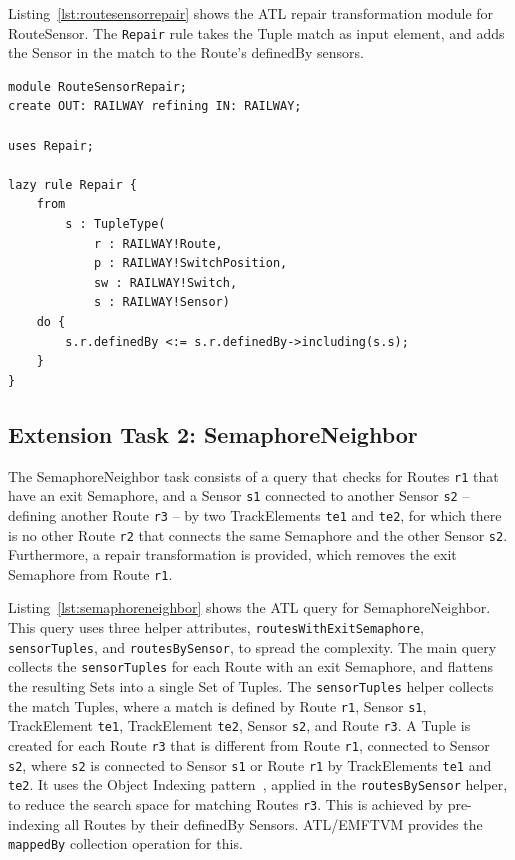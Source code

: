 \documentclass[submission,copyright,creativecommons]{eptcs}
\begin{document}
Listing~\ref{lst:routesensorrepair} shows the ATL repair transformation module for RouteSensor. The \texttt{Repair} rule takes the Tuple match as input element, and adds the Sensor in the match to the Route's definedBy sensors.

\lstset{language=atl}
\begin{lstlisting}[float=htb, caption={RouteSensor repair transformation module in ATL}, label=lst:routesensorrepair, captionpos=b, frame=tb, belowskip=-10pt]
module RouteSensorRepair;
create OUT: RAILWAY refining IN: RAILWAY;

uses Repair;

lazy rule Repair {
	from
		s : TupleType(
			r : RAILWAY!Route, 
			p : RAILWAY!SwitchPosition, 
			sw : RAILWAY!Switch,
			s : RAILWAY!Sensor)
	do {
		s.r.definedBy <:= s.r.definedBy->including(s.s);
	}
}
\end{lstlisting}

\subsection{Extension Task 2: SemaphoreNeighbor}

The SemaphoreNeighbor task consists of a query that checks for Routes \texttt{r1} that have an exit Semaphore, and a Sensor \texttt{s1} connected to another Sensor \texttt{s2} -- defining another Route \texttt{r3} -- by two TrackElements \texttt{te1} and \texttt{te2}, for which there is no other Route \texttt{r2} that connects the same Semaphore and the other Sensor \texttt{s2}. Furthermore, a repair transformation is provided, which removes the exit Semaphore from Route \texttt{r1}. 

Listing~\ref{lst:semaphoreneighbor} shows the ATL query for SemaphoreNeighbor. This query uses three helper attributes, \texttt{routesWithExitSemaphore}, \texttt{sensorTuples}, and \texttt{routesBySensor}, to spread the complexity. The main query collects the \texttt{sensorTuples} for each Route with an exit Semaphore, and flattens the resulting Sets into a single Set of Tuples. The \texttt{sensorTuples} helper collects the match Tuples, where a match is defined by Route \texttt{r1}, Sensor \texttt{s1}, TrackElement \texttt{te1}, TrackElement \texttt{te2}, Sensor \texttt{s2}, and Route \texttt{r3}. A Tuple is created for each Route \texttt{r3} that is different from Route \texttt{r1}, connected to Sensor \texttt{s2}, where \texttt{s2} is connected to Sensor \texttt{s1} or Route \texttt{r1} by TrackElements \texttt{te1} and \texttt{te2}. It uses the Object Indexing pattern~\cite{conf/icsea/Lano2011}, applied in the \texttt{routesBySensor} helper, to reduce the search space for matching Routes \texttt{r3}. This is achieved by pre-indexing all Routes by their definedBy Sensors. ATL/EMFTVM provides the \texttt{mappedBy} collection operation for this. 
\end{document}

